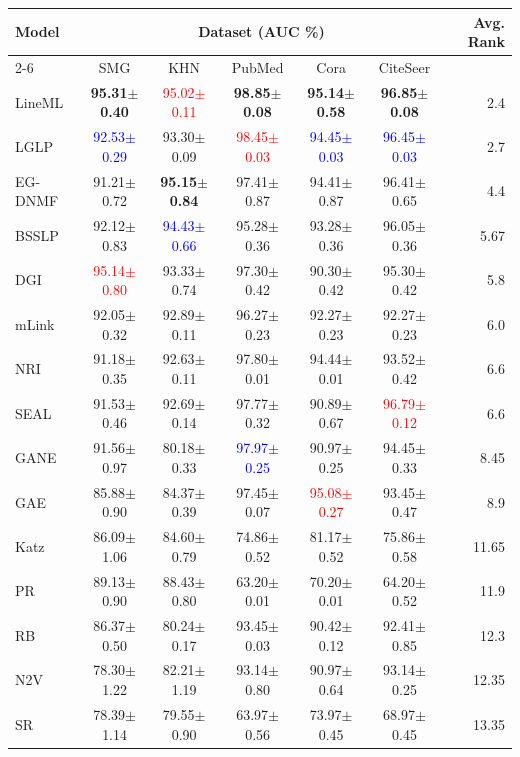 \documentclass[pdflatex,sn-mathphys-num]{sn-jnl}%
\theoremstyle{thmstyleone}%
\theoremstyle{thmstyletwo}%
\theoremstyle{thmstylethree}%
\theoremstyle{plain} %
\theoremstyle{definition} %
\theoremstyle{remark} %
\theoremstyle{plain} %
\begin{document}
\begin{table}[ht!]
\begin{tabular}{@{}lcccccr@{}}
\multirow{2}{*}{Model} & \multicolumn{5}{c}{Dataset (AUC \%)} & \multirow{2}{*}{Avg. Rank} \\
\cmidrule(lr){2-6}
& SMG & KHN & PubMed & Cora & CiteSeer & \\
\midrule
LineML  & \textbf{95.31$\pm$0.40} & \textcolor{red}{95.02$\pm$0.11} & \textbf{98.85$\pm$0.08} & \textbf{95.14$\pm$0.58} & \textbf{96.85$\pm$0.08} & 2.4 \\
LGLP    & \textcolor{blue}{92.53$\pm$0.29} & 93.30$\pm$0.09 & \textcolor{red}{98.45$\pm$0.03} & \textcolor{blue}{94.45$\pm$0.03} & \textcolor{blue}{96.45$\pm$0.03} & 2.7 \\
EG-DNMF    & 91.21$\pm$0.72 & \textbf{95.15$\pm$0.84} & 97.41$\pm$0.87 & 94.41$\pm$0.87 & 96.41$\pm$0.65 & 4.4 \\
BSSLP   & 92.12$\pm$0.83 & \textcolor{blue}{94.43$\pm$0.66} & 95.28$\pm$0.36 & 93.28$\pm$0.36 & 96.05$\pm$0.36 & 5.67 \\
DGI     & \textcolor{red}{95.14$\pm$0.80} & 93.33$\pm$0.74 & 97.30$\pm$0.42 & 90.30$\pm$0.42 & 95.30$\pm$0.42 & 5.8 \\
mLink   & 92.05$\pm$0.32 & 92.89$\pm$0.11 & 96.27$\pm$0.23 & 92.27$\pm$0.23 & 92.27$\pm$0.23 & 6.0 \\
NRI     & 91.18$\pm$0.35 & 92.63$\pm$0.11 & 97.80$\pm$0.01 & 94.44$\pm$0.01 & 93.52$\pm$0.42 & 6.6 \\
SEAL    & 91.53$\pm$0.46 & 92.69$\pm$0.14 & 97.77$\pm$0.32 & 90.89$\pm$0.67 & \textcolor{red}{96.79$\pm$0.12} & 6.6 \\
GANE    & 91.56$\pm$0.97 & 80.18$\pm$0.33 & \textcolor{blue}{97.97$\pm$0.25} & 90.97$\pm$0.25 & 94.45$\pm$0.33 & 8.45 \\
GAE     & 85.88$\pm$0.90 & 84.37$\pm$0.39 & 97.45$\pm$0.07 & \textcolor{red}{95.08$\pm$0.27} & 93.45$\pm$0.47 & 8.9 \\
Katz    & 86.09$\pm$1.06 & 84.60$\pm$0.79 & 74.86$\pm$0.52 & 81.17$\pm$0.52 & 75.86$\pm$0.58 & 11.65 \\
PR      & 89.13$\pm$0.90 & 88.43$\pm$0.80 & 63.20$\pm$0.01 & 70.20$\pm$0.01 & 64.20$\pm$0.52 & 11.9 \\
RB      & 86.37$\pm$0.50 & 80.24$\pm$0.17 & 93.45$\pm$0.03 & 90.42$\pm$0.12 & 92.41$\pm$0.85 & 12.3 \\
N2V     & 78.30$\pm$1.22 & 82.21$\pm$1.19 & 93.14$\pm$0.80 & 90.97$\pm$0.64 & 93.14$\pm$0.25 & 12.35 \\
SR      & 78.39$\pm$1.14 & 79.55$\pm$0.90 & 63.97$\pm$0.56 & 73.97$\pm$0.45 & 68.97$\pm$0.45 & 13.35 \\

\bottomrule
\end{tabular}
\end{table}
\end{document}

